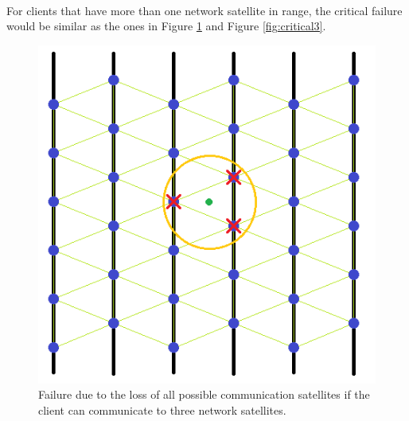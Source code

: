 \documentclass[12pt,a4paper]{report}
\begin{document}
\paragraph{}For clients that have more than one network satellite in range, the critical failure would be similar as the ones in Figure \ref{fig:critical2} and Figure \ref{fig:critical3}. 
\begin{figure}[H]
\begin{center}
\includegraphics[scale=0.5]{critical2.PNG}
\caption[3 communication range failure]{Failure due to the loss of all possible communication satellites if the client can communicate to three network satellites.}
\label{fig:critical2}
\end{center}
\end{figure}
\end{document}
